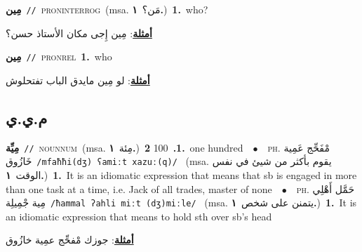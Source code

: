 \documentclass[10pt,a4paper,twoside]{article} %
\begin{document}
\begin{multicols}{2}
{\setlength\topsep{0pt}\textbf{\foreignlanguage{arabic}{مِين}}\ {\color{gray}\texttt{//}\color{black}}\ \textsc{pron\textunderscore interrog}\ \color{gray}(msa. \foreignlanguage{arabic}{مَن؟}~\foreignlanguage{arabic}{\textbf{١.}})\color{black}\ \textbf{1.}~who?\  \begin{flushright}\color{gray}\foreignlanguage{arabic}{\textbf{\underline{\foreignlanguage{arabic}{أمثلة}}}: مِين إِجى مكان الأستاذ حسن؟}\end{flushright}\color{black}} \vspace{2mm}

{\setlength\topsep{0pt}\textbf{\foreignlanguage{arabic}{مِين}}\ {\color{gray}\texttt{//}\color{black}}\ \textsc{pron\textunderscore rel}\ \textbf{1.}~who\  \begin{flushright}\color{gray}\foreignlanguage{arabic}{\textbf{\underline{\foreignlanguage{arabic}{أمثلة}}}: لو مِين مايدق الباب تفتحلوش}\end{flushright}\color{black}} \vspace{2mm}

\vspace{-3mm}
\subsection*{\color{blue}\foreignlanguage{arabic}{م.ي.ي}\color{blue}{}} 

{\setlength\topsep{0pt}\textbf{\foreignlanguage{arabic}{مِيِّة}}\ {\color{gray}\texttt{//}\color{black}}\ \textsc{noun\textunderscore num}\ \color{gray}(msa. \foreignlanguage{arabic}{مِئة}~\foreignlanguage{arabic}{\textbf{١.}})\color{black}\ \textbf{1.}~100  \textbf{2.}~one hundred\ \ $\bullet$\ \ \textsc{ph.} \color{gray} \foreignlanguage{arabic}{مْفَحِّج عَمِية خَازُوق}\color{black}\ {\color{gray}\texttt{/{\sffamily mfaħħi(dʒ) ʕamiːt xazuː(q)}/}\color{black}}\ \color{gray} (msa. \foreignlanguage{arabic}{يقوم بأكثر من شيئ في نفس الوقت}~\foreignlanguage{arabic}{\textbf{١.}})\color{black}\ \textbf{1.}~It is an idiomatic expression that means that sb is engaged in more than one task at a time, i.e. Jack of all trades, master of none\ \ $\bullet$\ \ \textsc{ph.} \color{gray} \foreignlanguage{arabic}{حَمَّل أَهْلِي مِية جْمِيلِة}\color{black}\ {\color{gray}\texttt{/{\sffamily ħammal ʔahli miːt (dʒ)miːle}/}\color{black}}\ \color{gray} (msa. \foreignlanguage{arabic}{يتمنن على شخص}~\foreignlanguage{arabic}{\textbf{١.}})\color{black}\ \textbf{1.}~It is an idiomatic expression that means to hold sth over sb's head\  \begin{flushright}\color{gray}\foreignlanguage{arabic}{\textbf{\underline{\foreignlanguage{arabic}{أمثلة}}}: جوزك مْفحِّج عمِية خازُوق}\end{flushright}\color{black}} \vspace{2mm}

\end{multicols}
\end{document}
